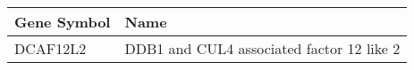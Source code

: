 \begin{tabular}{ll}
\toprule
Gene Symbol &                                      Name \\
\midrule
   DCAF12L2 & DDB1 and CUL4 associated factor 12 like 2 \\
\bottomrule
\end{tabular}

